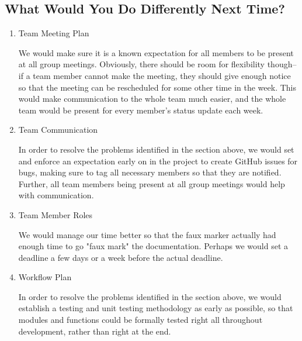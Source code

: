 \documentclass{article}
\begin{document}
\subsection{What Would You Do Differently Next Time?}


\begin{enumerate}
    \item {Team Meeting Plan}

    We would make sure it is a known expectation for all members to be present at all group meetings. Obviously, there should be room for flexibility though--if a team member cannot make the meeting, they should give enough notice so that the meeting can be rescheduled for some other time in the week. This would make communication to the whole team much easier, and the whole team would be present for every member's status update each week.

    \item{Team Communication}

    In order to resolve the problems identified in the section above, we would set and enforce an expectation early on in the project to create GitHub issues for bugs, making sure to tag all necessary members so that they are notified. Further, all team members being present at all group meetings would help with communication.

    \item{Team Member Roles}
    
    We would manage our time better so that the faux marker actually had enough time to go "faux mark" the documentation. Perhaps we would set a deadline a few days or a week before the actual deadline.

    \item{Workflow Plan}
    
    In order to resolve the problems identified in the section above, we would establish a testing and unit testing methodology as early as possible, so that modules and functions could be formally tested right all throughout development, rather than right at the end.
    
\end{enumerate}
\end{document}
